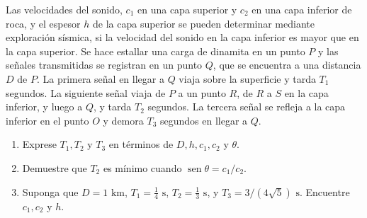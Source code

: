 \item Las velocidades del sonido, $c_1$ en una capa superior y $c_2$ en una capa inferior de roca, y el espesor $h$ de la capa superior se pueden determinar mediante exploración sísmica, si la velocidad del sonido en la capa inferior es mayor que en la capa superior. Se hace estallar una carga de dinamita en un punto $P$ y las señales transmitidas se registran en un punto $Q$, que se encuentra a una distancia $D$ de $P$. La primera señal en llegar a $Q$ viaja sobre la superficie y tarda $T_1$ segundos. La siguiente señal viaja de $P$ a un punto $R$, de $R$ a $S$ en la capa inferior, y luego a $Q$, y tarda $T_2$ segundos. La tercera señal se refleja a la capa inferior en el punto $O$ y demora $T_3$ segundos en llegar a $Q$.
\begin{enumerate}
    \item[(a)] Exprese $T_1, T_2$ y $T_3$ en términos de $D, h, c_1, c_2$ y $\theta$.
    \item[(b)] Demuestre que $T_2$ es mínimo cuando $\operatorname{sen} \theta = c_1/c_2$.
    \item[(c)] Suponga que $D = 1 \text{ km}$, $T_1 = \frac{1}{4} \text{ s}$, $T_2 = \frac{1}{3} \text{ s}$, y $T_3 = 3/(4\sqrt{5}) \text{ s}$. Encuentre $c_1, c_2$ y $h$.
\end{enumerate}
\begin{center}
\end{center}
